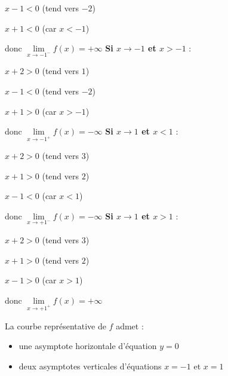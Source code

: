 \begin{corrige}
\begin{enumerate}
          \par
          $x-1 < 0$ (tend vers $-2$)
          \par
          $x+1 < 0$ (car $x < -1$)
          \par
          donc $\lim\limits_{x\rightarrow -1^-}f\left(x\right)=+\infty $
\medskip
          \textbf{Si $x\rightarrow -1$ et $x > -1$} :
          \par
          $x+2 > 0$ (tend vers $1$)
          \par
          $x-1 < 0$ (tend vers $-2$)
          \par
          $x+1 > 0$ (car $x > -1$)
          \par
          donc $\lim\limits_{x\rightarrow -1^+}f\left(x\right)=-\infty $
\medskip
          \textbf{Si $x\rightarrow 1$ et $x < 1$} :
          \par
          $x+2 > 0$ (tend vers $3$)
          \par
          $x+1 > 0$ (tend vers $2$)
          \par
          $x-1 < 0$ (car $x < 1$)
          \par
          donc $\lim\limits_{x\rightarrow +1^-}f\left(x\right)=-\infty $
\medskip
          \textbf{Si $x\rightarrow 1$ et $x > 1$} :
          \par
          $x+2 > 0$ (tend vers $3$)
          \par
          $x+1 > 0$ (tend vers $2$)
          \par
          $x-1 > 0$ (car $x > 1$)
          \par
          donc $\lim\limits_{x\rightarrow +1^+}f\left(x\right)=+\infty $
     \end{enumerate}
     La courbe représentative de $f$ admet :
     \begin{itemize}
          \item
          une asymptote horizontale d'équation $y=0$
          \item
          deux asymptotes verticales d'équations $x=-1$ et $x=1$
     \end{itemize}
\begin{center}
 \begin{extern}%
    \resizebox{11cm}{!}{
}
\end{extern}
\end{center}
\end{corrige}
